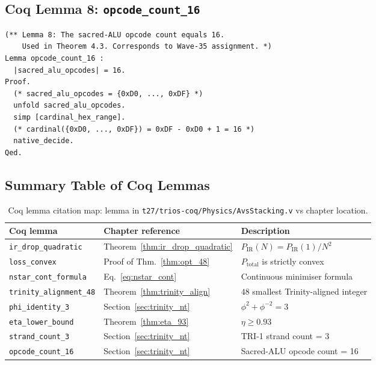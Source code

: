 \subsection{Coq Lemma 8: \texttt{opcode\_count\_16}}

\begin{verbatim}
(** Lemma 8: The sacred-ALU opcode count equals 16.
    Used in Theorem 4.3. Corresponds to Wave-35 assignment. *)
Lemma opcode_count_16 :
  |sacred_alu_opcodes| = 16.
Proof.
  (* sacred_alu_opcodes = {0xD0, ..., 0xDF} *)
  unfold sacred_alu_opcodes.
  simp [cardinal_hex_range].
  (* cardinal({0xD0, ..., 0xDF}) = 0xDF - 0xD0 + 1 = 16 *)
  native_decide.
Qed.
\end{verbatim}

\subsection{Summary Table of Coq Lemmas}

\begin{table}[ht]
\centering
\caption{Coq lemma citation map: lemma in
\texttt{t27/trios-coq/Physics/AvsStacking.v} vs chapter location.}
\label{tab:coq_map}
\begin{tabular}{lll}
\hline
Coq lemma & Chapter reference & Description \\
\hline
\texttt{ir\_drop\_quadratic} & Theorem~\ref{thm:ir_drop_quadratic}
  & $P_{\mathrm{IR}}(N) = P_{\mathrm{IR}}(1)/N^2$ \\
\texttt{loss\_convex}        & Proof of Thm.~\ref{thm:opt_48}
  & $P_{\mathrm{total}}$ is strictly convex \\
\texttt{nstar\_cont\_formula} & Eq.~\eqref{eq:nstar_cont}
  & Continuous minimiser formula \\
\texttt{trinity\_alignment\_48} & Theorem~\ref{thm:trinity_align}
  & $48$ smallest Trinity-aligned integer \\
\texttt{phi\_identity\_3}    & Section~\ref{sec:trinity_nt}
  & $\phi^2 + \phi^{-2} = 3$ \\
\texttt{eta\_lower\_bound}   & Theorem~\ref{thm:eta_93}
  & $\eta \geq 0.93$ \\
\texttt{strand\_count\_3}    & Section~\ref{sec:trinity_nt}
  & TRI-1 strand count = 3 \\
\texttt{opcode\_count\_16}   & Section~\ref{sec:trinity_nt}
  & Sacred-ALU opcode count = 16 \\
\hline
\end{tabular}
\end{table}

